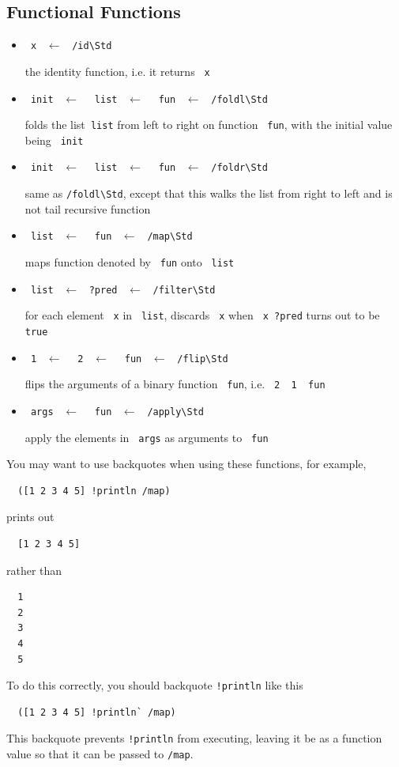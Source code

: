 \documentclass{report}
\newcommand{\mstd}[1]{\texttt{#1\textbackslash Std}}
\newcommand{\mtilde}[1]{\textasciitilde}
\newcommand{\marg}[1]{\texttt{\mtilde ~#1}}
\newcommand{\mla}[0]{~$\leftarrow$ ~}
\begin{document}
\subsection{Functional Functions}

\begin{itemize}
\item \marg{x} \mla \mstd{/id}

the identity function, i.e. it returns \marg{x}
\item \marg{init} \mla \marg{list} \mla \marg{fun} \mla \mstd{/foldl}

folds the  list\marg{list} from left to right on function \marg{fun}, with the initial value being \marg{init}
\item \marg{init} \mla \marg{list} \mla \marg{fun} \mla \mstd{/foldr}

same as \mstd{/foldl}, except that this walks the list from right to left and is not tail recursive function
\item \marg{list} \mla \marg{fun} \mla \mstd{/map}

maps function denoted by \marg{fun} onto \marg{list}
\item \marg{list} \mla \texttt{?pred} \mla \mstd{/filter}

for each element \marg{x} in \marg{list}, discards \marg{x} when \texttt{\marg{x} ?pred} turns out to be \texttt{true}
\item \marg1 \mla \marg2 \mla \marg{fun} \mla \mstd{/flip}

flips the arguments of a binary function \marg{fun}, i.e. \texttt{\marg2 \marg1 \marg{fun}}
\item \marg{args} \mla \marg{fun} \mla \mstd{/apply}

apply the elements in \marg{args} as arguments to \marg{fun}
\end{itemize}

\begin{mdframed}[style=hint]
  You may want to use backquotes when using these functions, for example,

\begin{verbatim}
  ([1 2 3 4 5] !println /map)
\end{verbatim}

prints out
\begin{verbatim}
  [1 2 3 4 5]
\end{verbatim}

rather than
\begin{verbatim}
  1
  2
  3
  4
  5
\end{verbatim}

To do this correctly, you should backquote \texttt{!println} like this

\begin{verbatim}
  ([1 2 3 4 5] !println` /map)
\end{verbatim}

This backquote prevents \texttt{!println} from executing, leaving it be as a function value so that it can be passed to \texttt{/map}.
\end{mdframed}
\end{document}
